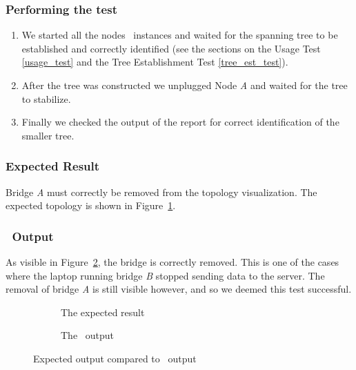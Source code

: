 \subsubsection*{Performing the test}
\begin{enumerate}
    \item We started all the nodes \tool\ instances and waited for the spanning tree to be established and correctly identified (see the sections on the Usage Test \ref{usage_test} and the Tree Establishment Test \ref{tree_est_test}).
    \item After the tree was constructed we unplugged Node \textit{A} and waited for the tree to stabilize.
    \item Finally we checked the output of the report for correct identification of the smaller tree.
\end{enumerate}

\subsubsection*{Expected Result}
Bridge \textit{A} must correctly be removed from the topology visualization.
The expected topology is shown in Figure~\ref{fig:removalExp}.

\subsubsection*{\tool\ Output}
As visible in Figure~\ref{fig:removal}, the bridge is correctly removed.
This is one of the cases where the laptop running bridge \textit{B} stopped sending data to the server.
The removal of bridge \textit{A} is still visible however, and so we deemed this test successful.

\begin{figure}[h]
    \begin{subfigure}[b]{\textwidth}
        \centering
        \caption{The expected result}
        \label{fig:removalExp}
    \end{subfigure}

    \vspace{0.5cm}

    \begin{subfigure}[b]{\textwidth}
        \centering
        
        \caption{The \tool\ output}
    \end{subfigure}
    \caption{Expected output compared to \tool\ output}
    \label{fig:removal}
\end{figure}

